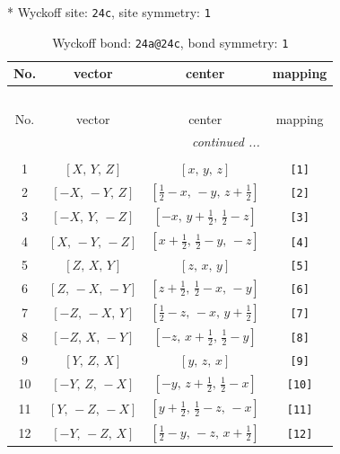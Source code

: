 \documentclass[fleqn,8pt]{jsarticle}
\begin{document}
* Wyckoff site: {\tt 24c}, site symmetry: {\tt 1}
\renewcommand{\arraystretch}{1.2}
\begin{longtable}{cccc}
\caption{Wyckoff bond: {\tt 24a@24c}, bond symmetry: {\tt 1}}
 \\
 \hline \hline
No. & vector & center & mapping \\ \hline \endfirsthead

\multicolumn{3}{l}{\tablename\ \thetable{}} \\
 \hline \hline
No. & vector & center & mapping \\ \hline \endhead

 \hline \hline
\multicolumn{3}{r}{\footnotesize\it continued ...} \\ \endfoot

 \hline \hline
\multicolumn{3}{r}{} \\ \endlastfoot

1 & $\left[ X,\, Y,\, Z \right]$ & $\left[ x,\, y,\, z \right]$ & {\tt [1]} \\ \hline
2 & $\left[ - X,\, - Y,\, Z \right]$ & $\left[ \frac{1}{2} - x,\, - y,\, z + \frac{1}{2} \right]$ & {\tt [2]} \\ \hline
3 & $\left[ - X,\, Y,\, - Z \right]$ & $\left[ - x,\, y + \frac{1}{2},\, \frac{1}{2} - z \right]$ & {\tt [3]} \\ \hline
4 & $\left[ X,\, - Y,\, - Z \right]$ & $\left[ x + \frac{1}{2},\, \frac{1}{2} - y,\, - z \right]$ & {\tt [4]} \\ \hline
5 & $\left[ Z,\, X,\, Y \right]$ & $\left[ z,\, x,\, y \right]$ & {\tt [5]} \\ \hline
6 & $\left[ Z,\, - X,\, - Y \right]$ & $\left[ z + \frac{1}{2},\, \frac{1}{2} - x,\, - y \right]$ & {\tt [6]} \\ \hline
7 & $\left[ - Z,\, - X,\, Y \right]$ & $\left[ \frac{1}{2} - z,\, - x,\, y + \frac{1}{2} \right]$ & {\tt [7]} \\ \hline
8 & $\left[ - Z,\, X,\, - Y \right]$ & $\left[ - z,\, x + \frac{1}{2},\, \frac{1}{2} - y \right]$ & {\tt [8]} \\ \hline
9 & $\left[ Y,\, Z,\, X \right]$ & $\left[ y,\, z,\, x \right]$ & {\tt [9]} \\ \hline
10 & $\left[ - Y,\, Z,\, - X \right]$ & $\left[ - y,\, z + \frac{1}{2},\, \frac{1}{2} - x \right]$ & {\tt [10]} \\ \hline
11 & $\left[ Y,\, - Z,\, - X \right]$ & $\left[ y + \frac{1}{2},\, \frac{1}{2} - z,\, - x \right]$ & {\tt [11]} \\ \hline
12 & $\left[ - Y,\, - Z,\, X \right]$ & $\left[ \frac{1}{2} - y,\, - z,\, x + \frac{1}{2} \right]$ & {\tt [12]} \\
\end{longtable}
\end{document}
